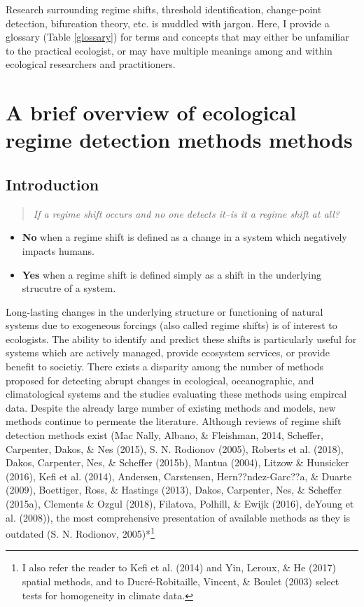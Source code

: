 \documentclass[12pt,twoside,openany]{reedthesis}
\providecommand{\tightlist}{%
  \setlength{\itemsep}{0pt}\setlength{\parskip}{0pt}}
\begin{document}
Research surrounding regime shifts, threshold identification,
change-point detection, bifurcation theory, etc. is muddled with jargon.
Here, I provide a glossary (Table \ref{glossary}) for terms and concepts
that may either be unfamiliar to the practical ecologist, or may have
multiple meanings among and within ecological researchers and
practitioners.

\chapter{A brief overview of ecological regime detection methods
methods}\label{rdmReview}

\section{Introduction}\label{introduction}
\begin{quote}
\emph{If a regime shift occurs and no one detects it--is it a regime
shift at all?}
\end{quote}
\begin{itemize}
\tightlist
\item
  \textbf{No} when a regime shift is defined as a change in a system
  which negatively impacts humans.
\item
  \textbf{Yes} when a regime shift is defined simply as a shift in the
  underlying strucutre of a system.
\end{itemize}
Long-lasting changes in the underlying structure or functioning of
natural systems due to exogeneous forcings (also called regime shifts)
is of interest to ecologists. The ability to identify and predict these
shifts is particularly useful for systems which are actively managed,
provide ecosystem services, or provide benefit to societiy. There exists
a disparity among the number of methods proposed for detecting abrupt
changes in ecological, oceanographic, and climatological systems and the
studies evaluating these methods using empircal data. Despite the
already large number of existing methods and models, new methods
continue to permeate the literature. Although reviews of regime shift
detection methods exist (Mac Nally, Albano, \& Fleishman, 2014,
Scheffer, Carpenter, Dakos, \& Nes (2015), S. N. Rodionov (2005),
Roberts et al. (2018), Dakos, Carpenter, Nes, \& Scheffer (2015b),
Mantua (2004), Litzow \& Hunsicker (2016), Kefi et al. (2014), Andersen,
Carstensen, Hern??ndez-Garc??a, \& Duarte (2009), Boettiger, Ross, \&
Hastings (2013), Dakos, Carpenter, Nes, \& Scheffer (2015a), Clements \&
Ozgul (2018), Filatova, Polhill, \& Ewijk (2016), deYoung et al.
(2008)), the most comprehensive presentation of available methods as
they is outdated (S. N. Rodionov, 2005)*\footnote{I also refer the
  reader to Kefi et al. (2014) and Yin, Leroux, \& He (2017) spatial
  methods, and to Ducré-Robitaille, Vincent, \& Boulet (2003) select
  tests for homogeneity in climate data.}
\end{document}
